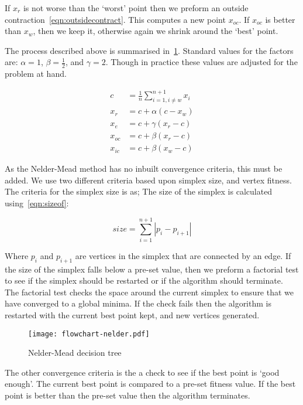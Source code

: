 If $x_r$ is not worse than the `worst' point then we preform an outside contraction~\cref{eqn:outsidecontract}.
This computes a new point $x_{oc}$.
If $x_{oc}$ is better than $x_w$, then we keep it, otherwise again we shrink around the `best' point.

The process described above is summarised in~\cref{fig:NM-algo}.
Standard values for the factors are: $\alpha=1$, $\beta=\frac{1}{2}$, and $\gamma=2$.
Though in practice these values are adjusted for the problem at hand.

\begin{align}
c &= \frac{1}{n}\sum \limits_{i=1,i\neq w}^{n+1} x_i \label{eqn:centroid}\\
x_r &= c + \alpha(c - x_w)\label{eqn:reflect}\\
x_e &= c + \gamma(x_r - c)\label{eqn:expand}\\
x_{oc} &= c + \beta(x_r - c)\label{eqn:outsidecontract}\\
x_{ic} &= c + \beta(x_w - c)\label{eqn:insidecontract}
\end{align}

As the Nelder-Mead method has no inbuilt convergence criteria, this must be added.
We use two different criteria based upon simplex size, and vertex fitness.
The criteria for the simplex size is as; The size of the simplex is calculated using~\cref{eqn:sizeof}:

\begin{equation}
size=\sum\limits_{i=1}^{n+1}|p_{i}-p_{i+1}|
\label{eqn:sizeof}
\end{equation}

Where $p_i$ and $p_{i+1}$ are vertices in the simplex that are connected by an edge. 
If the size of the simplex falls below a pre-set value, then we preform a factorial test to see if the simplex should be restarted or if the algorithm should terminate.
The factorial test checks the space around the current simplex to ensure that we have converged to a global minima.
If the check fails then the algorithm is restarted with the current best point kept, and new vertices generated.

\begin{figure}[!htbp]
    \centering
    \texttt{[image: flowchart-nelder.pdf]}
    \caption{Nelder-Mead decision tree}
    \label{fig:NM-algo}
\end{figure}

The other convergence criteria is the a check to see if the best point is `good enough'.
The current best point is compared to a pre-set fitness value.
If the best point is better than the pre-set value then the algorithm terminates.

